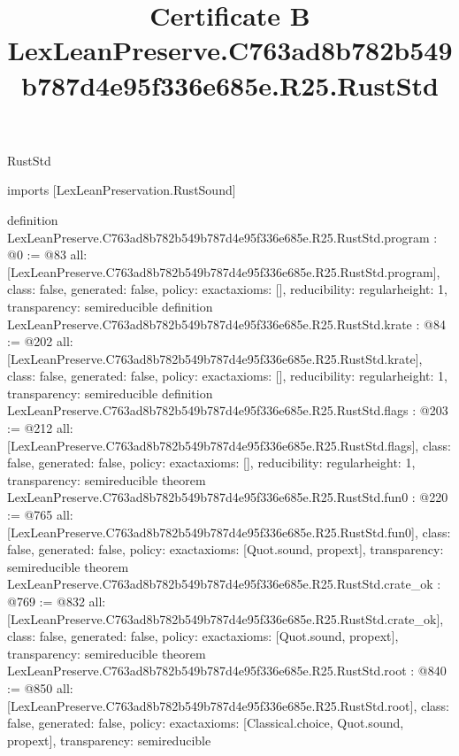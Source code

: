 \begin{lexlean}{RustStd}
\title{Certificate B LexLeanPreserve.C763ad8b782b549b787d4e95f336e685e.R25.RustStd}
\begin{coremodule}
imports [LexLeanPreservation.RustSound]

definition LexLeanPreserve.C763ad8b782b549b787d4e95f336e685e.R25.RustStd.program : @0 := @83 {
  all: [LexLeanPreserve.C763ad8b782b549b787d4e95f336e685e.R25.RustStd.program],
  class: false,
  generated: false,
  policy: exact{axioms: []},
  reducibility: regular{height: 1},
  transparency: semireducible
}
definition LexLeanPreserve.C763ad8b782b549b787d4e95f336e685e.R25.RustStd.krate : @84 := @202 {
  all: [LexLeanPreserve.C763ad8b782b549b787d4e95f336e685e.R25.RustStd.krate],
  class: false,
  generated: false,
  policy: exact{axioms: []},
  reducibility: regular{height: 1},
  transparency: semireducible
}
definition LexLeanPreserve.C763ad8b782b549b787d4e95f336e685e.R25.RustStd.flags : @203 := @212 {
  all: [LexLeanPreserve.C763ad8b782b549b787d4e95f336e685e.R25.RustStd.flags],
  class: false,
  generated: false,
  policy: exact{axioms: []},
  reducibility: regular{height: 1},
  transparency: semireducible
}
theorem LexLeanPreserve.C763ad8b782b549b787d4e95f336e685e.R25.RustStd.fun0 : @220 := @765 {
  all: [LexLeanPreserve.C763ad8b782b549b787d4e95f336e685e.R25.RustStd.fun0],
  class: false,
  generated: false,
  policy: exact{axioms: [Quot.sound, propext]},
  transparency: semireducible
}
theorem LexLeanPreserve.C763ad8b782b549b787d4e95f336e685e.R25.RustStd.crate_ok : @769 := @832 {
  all: [LexLeanPreserve.C763ad8b782b549b787d4e95f336e685e.R25.RustStd.crate_ok],
  class: false,
  generated: false,
  policy: exact{axioms: [Quot.sound, propext]},
  transparency: semireducible
}
theorem LexLeanPreserve.C763ad8b782b549b787d4e95f336e685e.R25.RustStd.root : @840 := @850 {
  all: [LexLeanPreserve.C763ad8b782b549b787d4e95f336e685e.R25.RustStd.root],
  class: false,
  generated: false,
  policy: exact{axioms: [Classical.choice, Quot.sound, propext]},
  transparency: semireducible
}


\end{coremodule}
\end{lexlean}
